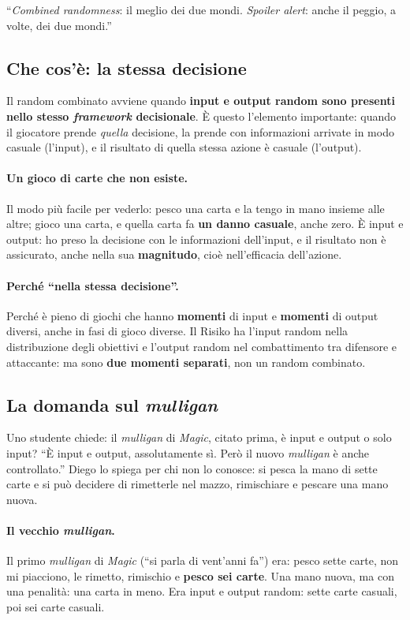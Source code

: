 ``\emph{Combined randomness}: il meglio dei due mondi. \emph{Spoiler alert}: anche il peggio,
a volte, dei due mondi.''

\subsection{Che cos'è: la stessa decisione}

Il random combinato avviene quando \textbf{input e output random sono presenti nello stesso
\emph{framework} decisionale}. È questo l'elemento importante: quando il giocatore prende
\emph{quella} decisione, la prende con informazioni arrivate in modo casuale (l'input), e il
risultato di quella stessa azione è casuale (l'output).

\paragraph{Un gioco di carte che non esiste.} Il modo più facile per vederlo: pesco una carta
e la tengo in mano insieme alle altre; gioco una carta, e quella carta fa \textbf{un danno
casuale}, anche zero. È input e output: ho preso la decisione con le informazioni dell'input,
e il risultato non è assicurato, anche nella sua \textbf{magnitudo}, cioè nell'efficacia
dell'azione.

\paragraph{Perché ``nella stessa decisione''.} Perché è pieno di giochi che hanno
\textbf{momenti} di input e \textbf{momenti} di output diversi, anche in fasi di gioco
diverse. Il Risiko ha l'input random nella distribuzione degli obiettivi e l'output random
nel combattimento tra difensore e attaccante: ma sono \textbf{due momenti separati}, non
un random combinato.

\subsection{La domanda sul \emph{mulligan}}

Uno studente chiede: il \emph{mulligan} di \emph{Magic}, citato prima, è input e output o
solo input? ``È input e output, assolutamente sì. Però il nuovo \emph{mulligan} è anche
controllato.'' Diego lo spiega per chi non lo conosce: si pesca la mano di sette carte e si può
decidere di rimetterle nel mazzo, rimischiare e pescare una mano nuova.

\paragraph{Il vecchio \emph{mulligan}.} Il primo \emph{mulligan} di \emph{Magic} (``si parla di
vent'anni fa'') era: pesco sette carte, non mi piacciono, le rimetto, rimischio e
\textbf{pesco sei carte}. Una mano nuova, ma con una penalità: una carta in meno. Era input e
output random: sette carte casuali, poi sei carte casuali.

